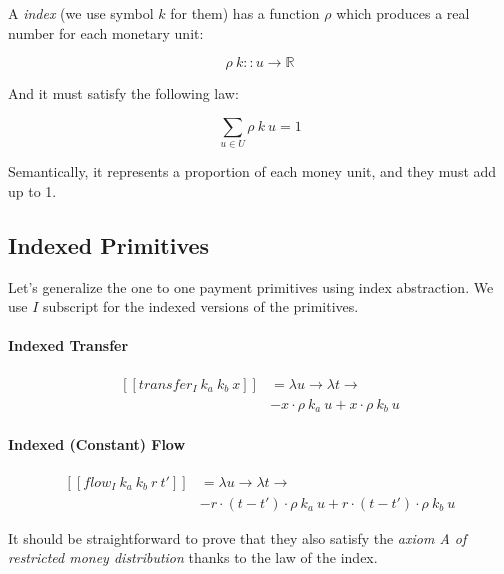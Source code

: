 A \textit{index} (we use symbol $k$ for them) has a function $\rho$ which produces a real number for each monetary unit:

\begin{equation}
    \rho\ k :: u \rightarrow \mathbb{R}
\end{equation}

And it must satisfy the following law:

\begin{equation}
    \displaystyle \sum_{u \in U} \rho\ k\ u = 1
\end{equation}

Semantically, it represents a proportion of each money unit, and they must add up to 1.

\subsection{Indexed Primitives}

Let's generalize the one to one payment primitives using index abstraction. We use $I$ subscript for the indexed
versions of the primitives.

\paragraph{Indexed Transfer}

\begin{equation}
    \begin{split}
        [\![transfer_I\ k_a\ k_b\ x]\!] &=
        \lambda u \rightarrow \lambda t \rightarrow \\
        &-x \cdot \rho\ k_a\ u + x \cdot \rho\ k_b\ u
    \end{split}
\end{equation}

\paragraph{Indexed (Constant) Flow}

\begin{equation}
    \begin{split}
        [\![flow_I\ k_a\ k_b\ r\ t']\!] &=
        \lambda u \rightarrow \lambda t \rightarrow \\
        &-r \cdot (t - t') \cdot \rho\ k_a\ u + r \cdot (t - t') \cdot \rho\ k_b\ u
    \end{split}
\end{equation}

It should be straightforward to prove that they also satisfy the \textit{axiom A of restricted money distribution}
thanks to the law of the index.

